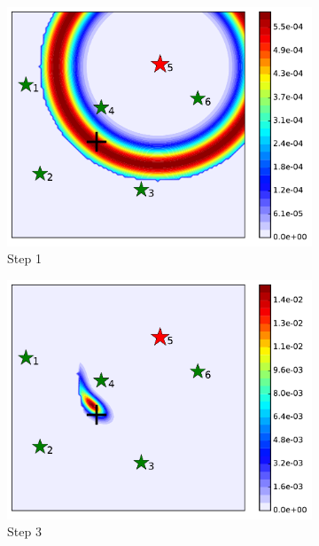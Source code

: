 \documentclass[journal]{IEEEtranTIE}
\theoremstyle{remark}
\begin{document}
	\begin{figure}%
		\centering
		\begin{subfigure}[b]{0.21\textwidth}
			\includegraphics[width=\textwidth]{hetero_sta_sen_sta_tar_rbt5_step1_16-TIE-3798}
			\caption{Step 1}\label{fig:htr_sta_sen_sta_tar_sing1}
		\end{subfigure}
		\begin{subfigure}[b]{0.21\textwidth}
			\includegraphics[width=\textwidth]{hetero_sta_sen_sta_tar_rbt5_step3_16-TIE-3798}
			\caption{Step 3}\label{fig:htr_sta_sen_sta_tar_sing2}
		\end{subfigure}
		\begin{subfigure}[b]{0.21\textwidth}

\end{subfigure}
\end{figure}
\end{document}
